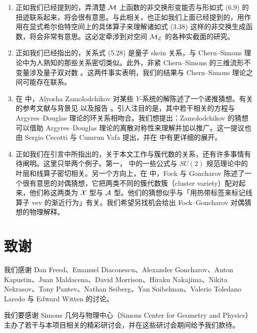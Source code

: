 \begin{enumerate}
\item 正如我们已经提到的，弄清楚 $\mathcal{M}$ 上函数的非交换形变能否与形如式 (6.9)%
的扭迹联系起来，将会很有意思。与此相关，也正如我们上面已经提到的，用作用在显式希尔伯特空间上的具体算子来理解诸如式 (3.38)%
这样的非交换生成函数，将会非常有意思。这必定牵涉到对空间 $\mathcal{M}_{\mathcal{L}}$ 的各种实截面的研究。

\item 正如我们已经指出的，关系式 (5.28)%
是量子 skein 关系，与 Chern--Simons 理论中为人熟知的那些关系密切类似。此外，非紧 Chern--Simons 的三维流形不变量涉及量子双对数 \cite{Dimofte:2009yn}。这两件事实表明，我们的结果与 Chern--Simons 理论之间可能存在联系。

\item 在 \cite{Zamolodchikov:1991et} 中，Alyosha Zamolodchikov 对某些 $Y$-系统的解陈述了一个递推猜想。有关的参考文献与背景见 \cite{keller-periodicity} 以及报告 \cite{volkov-talk}。引人注目的是，其中若干相关的方程与 Argyres--Douglas 理论的环关系相吻合。我们想提出：Zamolodchikov 的猜想可以借助 Argyres--Douglas 理论的离散对称性来理解并加以推广。这一提议也由 Sergio Cecotti 与 Cumrun Vafa 提出，并在 \cite{CNV} 中有更详细的展开。

\item 正如我们在引言中所指出的，关于本文工作与簇代数的关系，还有许多事情有待阐明。这里只举两个例子。第一，\cite{Lampe} 中的一些公式与 $SU(2)$ 规范理论中的叶层和线算子密切相关。另一个方向上，在 \cite{MR2567745} 中，Fock 与 Goncharov 陈述了一个很有意思的对偶猜想，它把两类不同的簇代数簇（cluster variety）配对起来，他们称这两类为 $\mathcal{X}$ 型与 $\mathcal{A}$ 型。他们的猜想似乎与「用热带标签来标记线算子 vev 的渐近行为」有关。我们希望另找机会给出 Fock--Goncharov 对偶猜想的物理解释。

\end{enumerate}

\section*{致谢}

我们感谢 Dan Freed、Emanuel Diaconescu、Alexander Goncharov、Anton Kapustin、Juan Maldacena、David Morrison、Hiraku Nakajima、Nikita Nekrasov、Tony Pantev、Nathan Seiberg、Yan Soibelman、Valerio Toledano Laredo 与 Edward Witten 的讨论。

我们要感谢 Simons 几何与物理中心（Simons Center for Geometry and Physics）主办了若干与本项目相关的精彩研讨会，并在这些研讨会期间给予我们款待。

